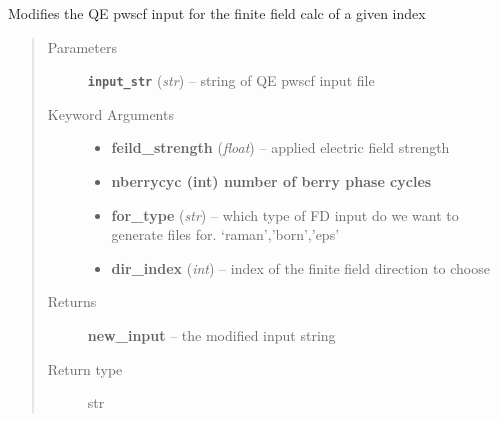 \documentclass[letterpaper,10pt,english]{sphinxmanual}
\begin{document}
\begin{fulllineitems}
\label{run:run.__field_factory}
Modifies the QE pwscf input for the finite field calc of a given index
\begin{quote}\begin{description}
\item[{Parameters}] \leavevmode
\textbf{\texttt{input\_str}} (\emph{str}) -- string of QE pwscf input file

\item[{Keyword Arguments}] \leavevmode\begin{itemize}
\item {} 
\textbf{feild\_strength} (\emph{float}) --
applied electric field strength

\item {} 
\textbf{nberrycyc (int) number of berry phase cycles}

\item {} 
\textbf{for\_type} (\emph{str}) --
which type of FD input do we want to generate files for. `raman','born','eps'

\item {} 
\textbf{dir\_index} (\emph{int}) --
index of the finite field direction to choose

\end{itemize}

\item[{Returns}] \leavevmode
\textbf{new\_input} --
the modified input string

\item[{Return type}] \leavevmode
str

\end{description}\end{quote}

\end{fulllineitems}

\end{document}
